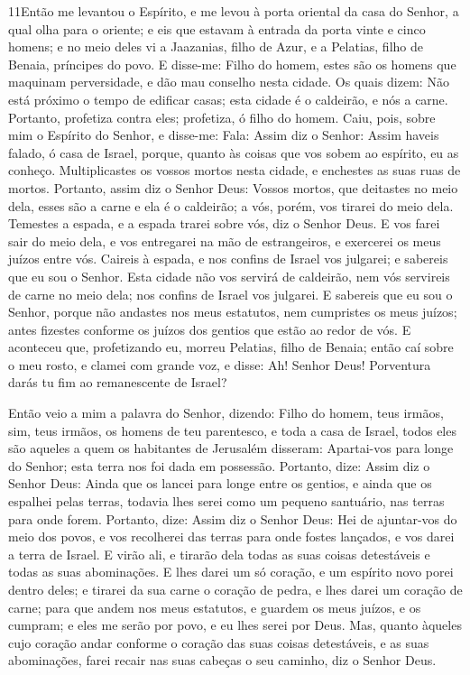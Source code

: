 \lettrine{11} Então me levantou o Espírito, e me levou à porta
oriental da casa do Senhor, a qual olha para o oriente; e eis que
estavam à entrada da porta vinte e cinco homens; e no meio deles vi
a Jaazanias, filho de Azur, e a Pelatias, filho de Benaia, príncipes
do povo. E disse-me: Filho do homem, estes são os homens que
maquinam perversidade, e dão mau conselho nesta cidade. Os quais
dizem: Não está próximo o tempo de edificar casas; esta cidade é o
caldeirão, e nós a carne. Portanto, profetiza contra eles;
profetiza, ó filho do homem. Caiu, pois, sobre mim o Espírito do
Senhor, e disse-me: Fala: Assim diz o Senhor: Assim haveis falado, ó
casa de Israel, porque, quanto às coisas que vos sobem ao espírito,
eu as conheço. Multiplicastes os vossos mortos nesta cidade, e
enchestes as suas ruas de mortos. Portanto, assim diz o Senhor
Deus: Vossos mortos, que deitastes no meio dela, esses são a carne e
ela é o caldeirão; a vós, porém, vos tirarei do meio dela.
Temestes a espada, e a espada trarei sobre vós, diz o Senhor
Deus. E vos farei sair do meio dela, e vos entregarei na mão de
estrangeiros, e exercerei os meus juízos entre vós. Caireis à
espada, e nos confins de Israel vos julgarei; e sabereis que eu sou
o Senhor. Esta cidade não vos servirá de caldeirão, nem vós
servireis de carne no meio dela; nos confins de Israel vos julgarei.
E sabereis que eu sou o Senhor, porque não andastes nos meus
estatutos, nem cumpristes os meus juízos; antes fizestes conforme os
juízos dos gentios que estão ao redor de vós. E aconteceu
que, profetizando eu, morreu Pelatias, filho de Benaia; então caí
sobre o meu rosto, e clamei com grande voz, e disse: Ah! Senhor
Deus! Porventura darás tu fim ao remanescente de Israel?

Então veio a mim a palavra do Senhor, dizendo: Filho do
homem, teus irmãos, sim, teus irmãos, os homens de teu parentesco, e
toda a casa de Israel, todos eles são aqueles a quem os habitantes
de Jerusalém disseram: Apartai-vos para longe do Senhor; esta terra
nos foi dada em possessão. Portanto, dize: Assim diz o Senhor
Deus: Ainda que os lancei para longe entre os gentios, e ainda que
os espalhei pelas terras, todavia lhes serei como um pequeno
santuário, nas terras para onde forem. Portanto, dize: Assim
diz o Senhor Deus: Hei de ajuntar-vos do meio dos povos, e vos
recolherei das terras para onde fostes lançados, e vos darei a terra
de Israel. E virão ali, e tirarão dela todas as suas coisas
detestáveis e todas as suas abominações. E lhes darei um só
coração, e um espírito novo porei dentro deles; e tirarei da sua
carne o coração de pedra, e lhes darei um coração de carne;
para que andem nos meus estatutos, e guardem os meus juízos,
e os cumpram; e eles me serão por povo, e eu lhes serei por Deus.
Mas, quanto àqueles cujo coração andar conforme o coração das
suas coisas detestáveis, e as suas abominações, farei recair nas
suas cabeças o seu caminho, diz o Senhor Deus.

